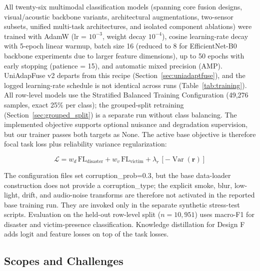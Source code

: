 \documentclass[journal]{IEEEtran}
\begin{document}
All twenty-six multimodal classification models (spanning core fusion designs, visual/acoustic backbone variants, architectural augmentations, two-sensor subsets, unified multi-task architectures, and isolated component ablations) were trained with AdamW (lr = $10^{-3}$, weight decay $10^{-4}$), cosine learning-rate decay with 5-epoch linear warmup, batch size 16 (reduced to 8 for EfficientNet-B0 backbone experiments due to larger feature dimensions), up to 50 epochs with early stopping (patience = 15), and automatic mixed precision (AMP). UniAdapFuse v2 departs from this recipe (Section~\ref{sec:uniadaptfuse}), and the logged learning-rate schedule is not identical across runs (Table~\ref{tab:training}). All row-level models use the Stratified Balanced Training Configuration (49{,}276 samples, exact 25\% per class); the grouped-split retraining (Section~\ref{sec:grouped_split}) is a separate run without class balancing. The implemented objective supports optional nuisance and degradation supervision, but our trainer passes both targets as None. The active base objective is therefore focal task loss plus reliability variance regularization:

\begin{equation}
    \mathcal{L} = w_d\,\text{FL}_{\text{disaster}} + w_v\,\text{FL}_{\text{victim}} + \lambda_r\,[-\operatorname{Var}(\mathbf{r})]
\end{equation}

The configuration files set corruption\_prob=0.3, but the base data-loader construction does not provide a corruption\_type; the explicit smoke, blur, low-light, drift, and audio-noise transforms are therefore not activated in the reported base training run. They are invoked only in the separate synthetic stress-test scripts. Evaluation on the held-out row-level split ($n=10{,}951$) uses macro-F1 for disaster and victim-presence classification. Knowledge distillation for Design F adds logit and feature losses on top of the task losses.

\subsection{Scopes and Challenges}
\end{document}
